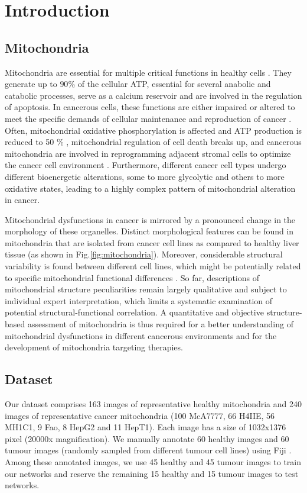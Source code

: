 	
	\chapter{Introduction}\label{chapter:introduction}
	\section{Mitochondria}
	Mitochondria are essential for multiple critical functions in healthy cells \cite{Alirol2006}. 
They generate up to $90\%$ of the cellular ATP, essential for several anabolic and catabolic processes, serve as a calcium reservoir and are involved in the regulation of apoptosis. In cancerous cells, these functions are either impaired or altered to meet the specific demands of cellular maintenance and reproduction of cancer \cite{Wallace2012}. Often,  mitochondrial oxidative phosphorylation is affected and  ATP production is reduced to 50 $\%$ \cite{Warburg309}, mitochondrial regulation of cell death breaks up, and cancerous mitochondria are involved in reprogramming adjacent stromal cells to optimize the cancer cell environment \cite{Wallace2012}. Furthermore, different cancer cell types undergo different bioenergetic alterations, some to more glycolytic and others to more oxidative states, leading to a highly complex pattern of mitochondrial alteration in cancer. 

Mitochondrial dysfunctions in cancer is mirrored by a pronounced change in the morphology of these organelles. Distinct morphological features can be found in mitochondria that are isolated from cancer cell lines as compared to healthy liver tissue (as shown in Fig.\ref{fig:mitochondria}). Moreover, considerable structural variability is found between different cell lines, which might be potentially related to specific mitochondrial functional differences \cite{Smith2012}. 
So far, descriptions of mitochondrial structure peculiarities remain largely qualitative and subject to individual expert interpretation, which limits a systematic examination of potential structural-functional correlation. A quantitative and objective structure-based assessment of mitochondria is thus required  for a better understanding of mitochondrial dysfunctions in different cancerous environments and for the development of mitochondria targeting therapies.\\
\section{Dataset}
\label{sec:dataset}
Our dataset comprises 163 images of representative healthy mitochondria and 240
images of representative cancer mitochondria (100 McA7777, 66 H4IIE, 56 MH1C1,
9 Fao, 8 HepG2 and 11 HepT1). Each image has a size of 1032x1376 pixel (20000x magnification). 
We manually annotate 60 healthy images and 60 tumour images
(randomly sampled from different tumour cell lines) using Fiji \cite{schindelin2012opensource}. Among these annotated images,
we use 45 healthy and 45 tumour images to train our networks and reserve the
remaining 15 healthy and 15 tumour images to test networks.\\
 \newpage
